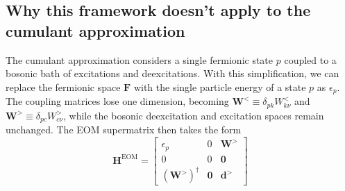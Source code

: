 \subsection{Why this framework doesn't apply to the cumulant approximation}
The cumulant approximation considers a single fermionic state $p$ coupled to a bosonic bath of excitations and deexcitations. With this simplification, we can replace the fermionic space $\bm{F}$ with the single particle energy of a state $p$ as $\epsilon_p$. The coupling matrices lose one dimension, becoming $\bm{W}^<\equiv \delta_{pk} W^<_{k\nu}$ and $\bm{W}^>\equiv \delta_{pc} W^>_{c\nu}$, while the bosonic deexcitation and excitation spaces remain unchanged. The EOM supermatrix then takes the form
\begin{equation}
\bm{H}^{\mathrm{EOM}} = \begin{bmatrix}
    \epsilon_p & 0 & \bm{W}^> \\
    0&0 & \bm{0} \\
    \left(\bm{W}^>\right)^\dagger & \bm{0} & \bm{d}^>
\end{bmatrix}\end{equation}

